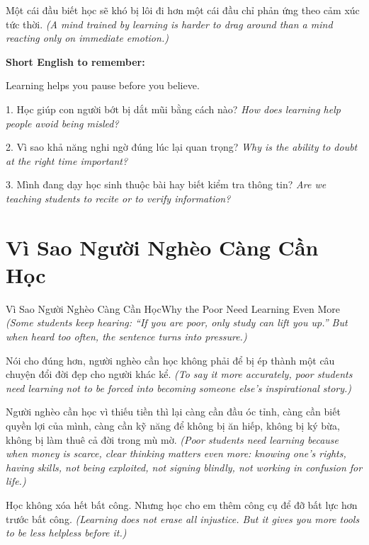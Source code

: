 \begin{baihoc}
Một cái đầu biết học sẽ khó bị lôi đi hơn một cái đầu chỉ phản ứng theo cảm xúc tức thời.
\textit{(A mind trained by learning is harder to drag around than a mind reacting only on immediate emotion.)}
\end{baihoc}

\begin{ghinhoanh}
\textbf{Short English to remember:}

Learning helps you pause before you believe.

\end{ghinhoanh}

\begin{tuhocnhanh}
1. Học giúp con người bớt bị dắt mũi bằng cách nào? \textit{How does learning help people avoid being misled?}

2. Vì sao khả năng nghi ngờ đúng lúc lại quan trọng? \textit{Why is the ability to doubt at the right time important?}

3. Mình đang dạy học sinh thuộc bài hay biết kiểm tra thông tin? \textit{Are we teaching students to recite or to verify information?}
\end{tuhocnhanh}
\ngancach

\section{Vì Sao Người Nghèo Càng Cần Học}
\begin{truyen}{Vì Sao Người Nghèo Càng Cần Học}{Why the Poor Need Learning Even More}
\textit{(Some students keep hearing: “If you are poor, only study can lift you up.” But when heard too often, the sentence turns into pressure.)}

Nói cho đúng hơn, người nghèo cần học không phải để bị ép thành một câu chuyện đổi đời đẹp cho người khác kể.
\textit{(To say it more accurately, poor students need learning not to be forced into becoming someone else's inspirational story.)}

Người nghèo cần học vì thiếu tiền thì lại càng cần đầu óc tỉnh, càng cần biết quyền lợi của mình, càng cần kỹ năng để không bị ăn hiếp, không bị ký bừa, không bị làm thuê cả đời trong mù mờ.
\textit{(Poor students need learning because when money is scarce, clear thinking matters even more: knowing one's rights, having skills, not being exploited, not signing blindly, not working in confusion for life.)}

Học không xóa hết bất công. Nhưng học cho em thêm công cụ để đỡ bất lực hơn trước bất công.
\textit{(Learning does not erase all injustice. But it gives you more tools to be less helpless before it.)}
\end{truyen}

